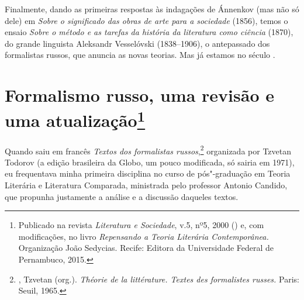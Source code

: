 Finalmente, dando as primeiras respostas às indagações de Ánnenkov (mas
não só dele) em \emph{Sobre o significado das obras de arte para a sociedade}
(1856), temos o ensaio \emph{Sobre o método e as tarefas da história da
literatura como ciência} (1870), do grande linguista Aleksandr
Vesselóvski (1838--1906), o antepassado dos formalistas russos, que anuncia as novas
teorias. Mas já estamos no século .

\chapter{Formalismo russo, uma revisão e uma atualização\footnote{Publicado na revista \emph{Literatura e Sociedade}, v.5, nº5, 2000 (\protect{}) e, com modificações, no livro \emph{Repensando a Teoria Literária Contemporânea.} Organização João Sedycias. Recife: Editora da Universidade Federal de Pernambuco, 2015.}}
\label{formalismo}

Quando saiu em francês \emph{Textos dos formalistas
russos},\footnote{, Tzvetan (org.). \emph{Théorie de la littérature. Textes des 
formalistes russes.} Paris: Seuil, 1965.} organizada por Tzvetan Todorov
(a edição brasileira da Globo, um pouco modificada, só sairia em 1971),
eu frequentava minha primeira disciplina no curso de pós"-graduação em Teoria Literária
e Literatura Comparada, ministrada pelo professor Antonio Candido, que propunha
justamente a análise e a discussão daqueles textos.


